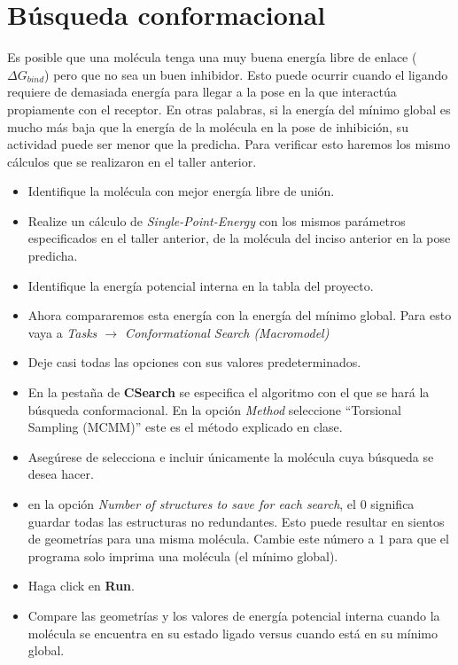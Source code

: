 \documentclass{article}
\begin{document}
\section{Búsqueda conformacional}
Es posible que una molécula tenga una muy buena energía libre de enlace ($\Delta G_{bind}$) pero que no sea un buen inhibidor. Esto puede ocurrir cuando el ligando requiere de demasiada energía para llegar a la pose en la que interactúa propiamente con el receptor. En otras palabras, si la energía del mínimo global es mucho más baja que la energía de la molécula en la pose de inhibición, su actividad puede ser menor que la predicha. Para verificar esto haremos los mismo cálculos que se realizaron en el taller anterior.
\begin{itemize}
    \item Identifique la molécula con mejor energía libre de unión.
    \item Realize un cálculo de \emph{Single-Point-Energy} con los mismos parámetros especificados en el taller anterior, de la molécula del inciso anterior en la pose predicha.
    \item Identifique la energía potencial interna en la tabla del proyecto.
    \item Ahora compararemos esta energía con la energía del mínimo global. Para esto vaya a \emph{Tasks $\rightarrow$ Conformational Search (Macromodel)}
    \item Deje casi todas las opciones con sus valores predeterminados.
    \item En la pestaña de \textbf{CSearch} se especifica el algoritmo con el que se hará la búsqueda conformacional. En la opción \emph{Method} seleccione ``Torsional Sampling (MCMM)'' este es el método explicado en clase. 
    \item Asegúrese de selecciona e incluir únicamente la molécula cuya búsqueda se desea hacer.
    \item en la opción \emph{Number of structures to save for each search}, el $0$ significa guardar todas las estructuras no redundantes. Esto puede resultar en sientos de geometrías para una misma molécula. Cambie este número a $1$ para que el programa solo imprima una molécula (el mínimo global).
    \item Haga click en \textbf{Run}.
    \item Compare las geometrías y los valores de energía potencial interna cuando la molécula se encuentra en su estado ligado versus cuando está en su mínimo global.
\end{itemize}
\end{document}
